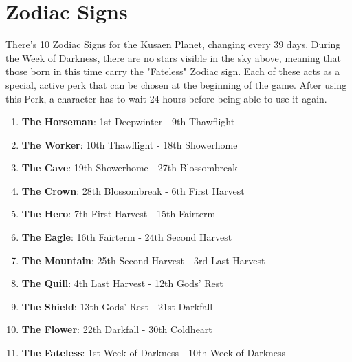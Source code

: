 \section{Zodiac Signs}\label{sec:zodiacs}
There's 10 Zodiac Signs for the Kusaen Planet, changing every 39 days.
During the Week of Darkness, there are no stars visible in the sky above, meaning that those born in this time carry the "Fateless" Zodiac sign.
Each of these acts as a special, active perk that can be chosen at the beginning of the game.
After using this Perk, a character has to wait 24 hours before being able to use it again.\\

\begin{enumerate}
	\item \textbf{The Horseman}: 1st Deepwinter - 9th Thawflight
	\item \textbf{The Worker}: 10th Thawflight - 18th Showerhome
	\item \textbf{The Cave}: 19th Showerhome - 27th Blossombreak
	\item \textbf{The Crown}: 28th Blossombreak - 6th First Harvest
	\item \textbf{The Hero}: 7th First Harvest - 15th Fairterm
	\item \textbf{The Eagle}: 16th Fairterm - 24th Second Harvest
	\item \textbf{The Mountain}: 25th Second Harvest - 3rd Last Harvest
	\item \textbf{The Quill}: 4th Last Harvest - 12th Gods' Rest
	\item \textbf{The Shield}: 13th Gods' Rest - 21st Darkfall
	\item \textbf{The Flower}: 22th Darkfall - 30th Coldheart
	\item \textbf{The Fateless}: 1st Week of Darkness - 10th Week of Darkness
\end{enumerate}























